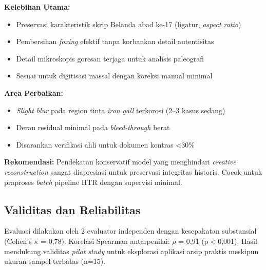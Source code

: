 \textbf{Kelebihan Utama:}
\begin{itemize}[leftmargin=*, itemsep=2pt]
    \item Preservasi karakteristik skrip Belanda abad ke-17 (ligatur, \textit{aspect ratio})
    \item Pembersihan \textit{foxing} efektif tanpa korbankan detail autentisitas
    \item Detail mikroskopis goresan terjaga untuk analisis paleografi
    \item Sesuai untuk digitisasi massal dengan koreksi manual minimal
\end{itemize}

\textbf{Area Perbaikan:}
\begin{itemize}[leftmargin=*, itemsep=2pt]
    \item \textit{Slight blur} pada region tinta \textit{iron gall} terkorosi (2--3 kasus sedang)
    \item Derau residual minimal pada \textit{bleed-through} berat
    \item Disarankan verifikasi ahli untuk dokumen kontras <30\%
\end{itemize}

\textbf{Rekomendasi:}
Pendekatan konservatif model yang menghindari \textit{creative reconstruction} sangat diapresiasi untuk preservasi integritas historis. Cocok untuk praproses \textit{batch} pipeline HTR dengan supervisi minimal.

\vspace{2em}

\subsection*{Validitas dan Reliabilitas}

Evaluasi dilakukan oleh 2 evaluator independen dengan kesepakatan substansial (Cohen's $\kappa$ = 0,78). Korelasi Spearman antarpenilai: $\rho$ = 0,91 (p$<$0,001). Hasil mendukung validitas \textit{pilot study} untuk eksplorasi aplikasi arsip praktis meskipun ukuran sampel terbatas (n=15).

